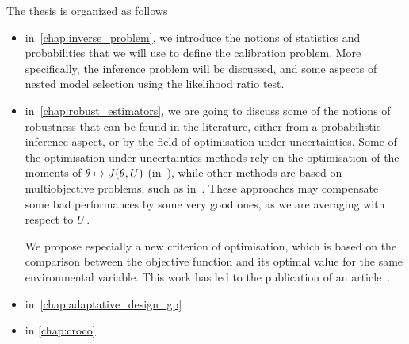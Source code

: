 \documentclass[../../Main_ManuscritThese.tex]{subfiles}
\begin{document}
The thesis is organized as follows
\begin{itemize}
\item in~\cref{chap:inverse_problem}, we introduce the notions of
  statistics and probabilities that we will use to define the
  calibration problem. More specifically, the inference problem will
  be discussed, and some aspects of nested model selection using the
  likelihood ratio test.
\item in~\cref{chap:robust_estimators}, we are going to discuss some
  of the notions of robustness that can be found in the literature,
  either from a probabilistic inference aspect, or by the field of
  optimisation under uncertainties.  Some of the optimisation under
  uncertainties methods rely on the optimisation of the moments of
  $ \theta\mapsto J(\theta,U)$
  (in~\cite{lehman_designing_2004,janusevskis_simultaneous_2010}),
  while other methods are based on multiobjective problems, such as
  in~\cite{baudoui_optimisation_2012,ribaud_krigeage_2018}. These
  approaches may compensate some bad performances by some very good
  ones, as we are averaging with respect to $U$.

  We propose especially a new
  criterion of optimisation, which is based on the comparison between
  the objective function and its optimal value for the same
  environmental variable. This work has led to the publication of an
  article~\cite{trappler_robust_2020-1}.
\item in~\cref{chap:adaptative_design_gp}
\item in \cref{chap:croco} 
\end{itemize}



\end{document}
